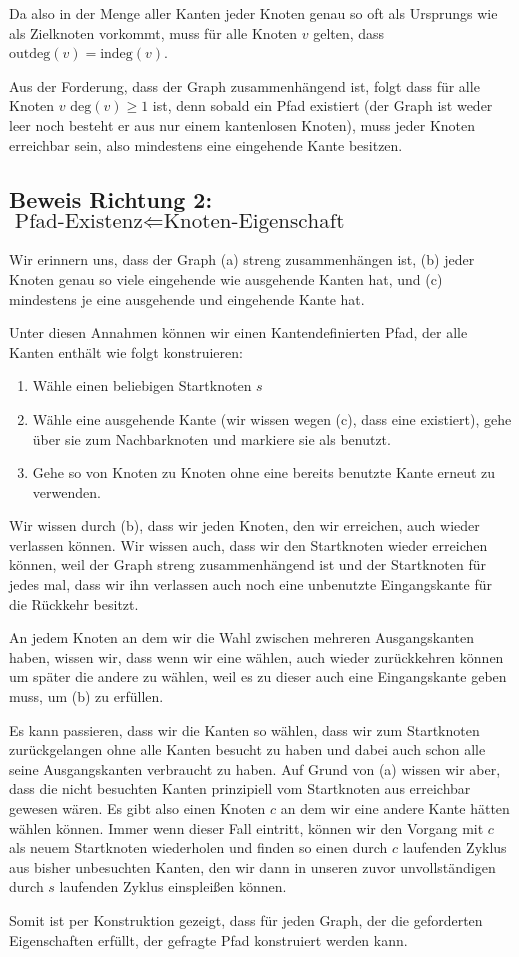 \documentclass[parskip=half,a4paper]{scrartcl}
\begin{document}
Da also in der Menge aller Kanten jeder Knoten genau so oft als Ursprungs wie als Zielknoten vorkommt, muss für alle Knoten $v$ gelten, dass $\text{outdeg}(v) = \text{indeg}(v)$.

Aus der Forderung, dass der Graph zusammenhängend ist, folgt dass für alle Knoten $v$ $\text{deg}(v) \ge 1$ ist, denn sobald ein Pfad existiert (der Graph ist weder leer noch besteht er aus nur einem kantenlosen Knoten), muss jeder Knoten erreichbar sein, also mindestens eine eingehende Kante besitzen.


\subsection*{Beweis Richtung 2: $\text{Pfad-Existenz} \Leftarrow \text{Knoten-Eigenschaft}$}

Wir erinnern uns, dass der Graph (a) streng zusammenhängen ist, (b) jeder Knoten genau so viele eingehende wie ausgehende Kanten hat, und (c) mindestens je eine ausgehende und eingehende Kante hat.

Unter diesen Annahmen können wir einen Kantendefinierten Pfad, der alle Kanten enthält wie folgt konstruieren:

\begin{enumerate}
    \item Wähle einen beliebigen Startknoten $s$
    \item Wähle eine ausgehende Kante (wir wissen wegen (c), dass eine existiert), gehe über sie zum Nachbarknoten und markiere sie als benutzt.
    \item Gehe so von Knoten zu Knoten ohne eine bereits benutzte Kante erneut zu verwenden.
\end{enumerate}

Wir wissen durch (b), dass wir jeden Knoten, den wir erreichen, auch wieder verlassen können. Wir wissen auch, dass wir den Startknoten wieder erreichen können, weil der Graph streng zusammenhängend ist und der Startknoten für jedes mal, dass wir ihn verlassen auch noch eine unbenutzte Eingangskante für die Rückkehr besitzt.

An jedem Knoten an dem wir die Wahl zwischen mehreren Ausgangskanten haben, wissen wir, dass wenn wir eine wählen, auch wieder zurückkehren können um später die andere zu wählen, weil es zu dieser auch eine Eingangskante geben muss, um (b) zu erfüllen.

Es kann passieren, dass wir die Kanten so wählen, dass wir zum Startknoten zurückgelangen ohne alle Kanten besucht zu haben und dabei auch schon alle seine Ausgangskanten verbraucht zu haben. Auf Grund von (a) wissen wir aber, dass die nicht besuchten Kanten prinzipiell vom Startknoten aus erreichbar gewesen wären. Es gibt also einen Knoten $c$ an dem wir eine andere Kante hätten wählen können. Immer wenn dieser Fall eintritt, können wir den Vorgang mit $c$ als neuem Startknoten wiederholen und finden so einen durch $c$ laufenden Zyklus aus bisher unbesuchten Kanten, den wir dann in unseren zuvor unvollständigen durch $s$ laufenden Zyklus einspleißen können.

Somit ist per Konstruktion gezeigt, dass für jeden Graph, der die geforderten Eigenschaften erfüllt, der gefragte Pfad konstruiert werden kann.
\end{document}
